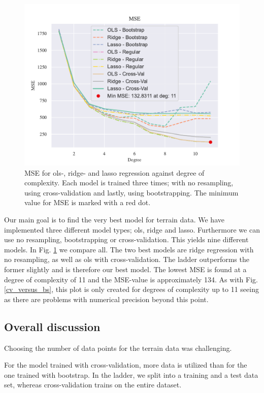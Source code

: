 \begin{figure}[h!]
    \centering
    \includegraphics[width=1\linewidth]{project_1_alt/figures/figures_in_report/All_Terrain.pdf}
    \caption{MSE for ols-, ridge- and lasso regression against degree of complexity. Each model is trained three times; with no resampling, using cross-validation and lastly, using bootstrapping. The minimum value for MSE is marked with a red dot.}
    \label{all_terrain}
\end{figure}

Our main goal is to find the very best model for terrain data. We have implemented three different model types; ols, ridge and lasso. Furthermore we can use no resampling, bootstrapping or cross-validation. This yields nine different models. In Fig. \ref{all_terrain} we compare all. The two best models are ridge regression with no resampling, as well as ols with cross-validation. The ladder outperforms the former slightly and is therefore our best model. The lowest MSE is found at a degree of complexity of 11 and the MSE-value is approximately 134. As with Fig. \ref{cv_versus_bs}, this plot is only created for degrees of complexity up to 11 seeing as there are problems with numerical precision beyond this point. 

\subsection{Overall discussion}

Choosing the number of data points for the terrain data was challenging. 

For the model trained with cross-validation, more data is utilized than for the one trained with bootstrap. In the ladder, we split into a training and a test data set, whereas cross-validation trains on the entire dataset. 

